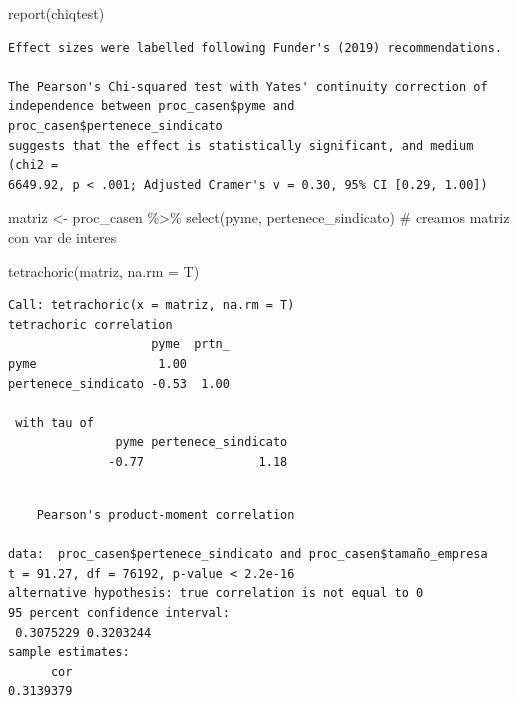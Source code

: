 \documentclass[
  a4paper,
  oneside]{scrbook}
\newenvironment{Shaded}{\begin{snugshade}}{\end{snugshade}}
\newcommand{\AttributeTok}[1]{\textcolor[rgb]{0.40,0.45,0.13}{#1}}
\newcommand{\CommentTok}[1]{\textcolor[rgb]{0.37,0.37,0.37}{#1}}
\newcommand{\FunctionTok}[1]{\textcolor[rgb]{0.28,0.35,0.67}{#1}}
\newcommand{\NormalTok}[1]{\textcolor[rgb]{0.00,0.23,0.31}{#1}}
\newcommand{\OtherTok}[1]{\textcolor[rgb]{0.00,0.23,0.31}{#1}}
\newcommand{\SpecialCharTok}[1]{\textcolor[rgb]{0.37,0.37,0.37}{#1}}
\begin{document}
\begin{Shaded}
\begin{Highlighting}[]
\FunctionTok{report}\NormalTok{(chiqtest)}
\end{Highlighting}
\end{Shaded}

\begin{verbatim}
Effect sizes were labelled following Funder's (2019) recommendations.

The Pearson's Chi-squared test with Yates' continuity correction of
independence between proc_casen$pyme and proc_casen$pertenece_sindicato
suggests that the effect is statistically significant, and medium (chi2 =
6649.92, p < .001; Adjusted Cramer's v = 0.30, 95% CI [0.29, 1.00])
\end{verbatim}

\begin{Shaded}
\begin{Highlighting}[]
\NormalTok{matriz }\OtherTok{\textless{}{-}}\NormalTok{ proc\_casen }\SpecialCharTok{\%\textgreater{}\%} \FunctionTok{select}\NormalTok{(pyme, pertenece\_sindicato) }\CommentTok{\# creamos matriz con var de interes}

\FunctionTok{tetrachoric}\NormalTok{(matriz, }\AttributeTok{na.rm =}\NormalTok{ T)}
\end{Highlighting}
\end{Shaded}

\begin{verbatim}
Call: tetrachoric(x = matriz, na.rm = T)
tetrachoric correlation 
                    pyme  prtn_
pyme                 1.00      
pertenece_sindicato -0.53  1.00

 with tau of 
               pyme pertenece_sindicato 
              -0.77                1.18 
\end{verbatim}

\begin{Shaded}
\end{Shaded}

\begin{verbatim}

    Pearson's product-moment correlation

data:  proc_casen$pertenece_sindicato and proc_casen$tamaño_empresa
t = 91.27, df = 76192, p-value < 2.2e-16
alternative hypothesis: true correlation is not equal to 0
95 percent confidence interval:
 0.3075229 0.3203244
sample estimates:
      cor 
0.3139379 
\end{verbatim}
\end{document}

